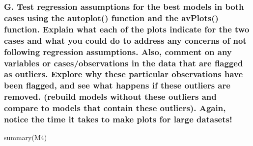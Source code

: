 \documentclass[
]{article}
\newenvironment{Shaded}{\begin{snugshade}}{\end{snugshade}}
\newcommand{\FunctionTok}[1]{\textcolor[rgb]{0.00,0.00,0.00}{#1}}
\newcommand{\NormalTok}[1]{#1}
\begin{document}
\hypertarget{g.-test-regression-assumptions-for-the-best-models-in-both-cases-using-the-autoplot-function-and-the-avplots-function.-explain-what-each-of-the-plots-indicate-for-the-two-cases-and-what-you-could-do-to-address-any-concerns-of-not-following-regression-assumptions.-also-comment-on-any-variables-or-casesobservations-in-the-data-that-are-flagged-as-outliers.-explore-why-these-particular-observations-have-been-flagged-and-see-what-happens-if-these-outliers-are-removed.-rebuild-models-without-these-outliers-and-compare-to-models-that-contain-these-outliers.-again-notice-the-time-it-takes-to-make-plots-for-large-datasets}{%
\subsubsection{G. Test regression assumptions for the best models in
both cases using the autoplot() function and the avPlots() function.
Explain what each of the plots indicate for the two cases and what you
could do to address any concerns of not following regression
assumptions. Also, comment on any variables or cases/observations in the
data that are flagged as outliers. Explore why these particular
observations have been flagged, and see what happens if these outliers
are removed. (rebuild models without these outliers and compare to
models that contain these outliers). Again, notice the time it takes to
make plots for large
datasets!}\label{g.-test-regression-assumptions-for-the-best-models-in-both-cases-using-the-autoplot-function-and-the-avplots-function.-explain-what-each-of-the-plots-indicate-for-the-two-cases-and-what-you-could-do-to-address-any-concerns-of-not-following-regression-assumptions.-also-comment-on-any-variables-or-casesobservations-in-the-data-that-are-flagged-as-outliers.-explore-why-these-particular-observations-have-been-flagged-and-see-what-happens-if-these-outliers-are-removed.-rebuild-models-without-these-outliers-and-compare-to-models-that-contain-these-outliers.-again-notice-the-time-it-takes-to-make-plots-for-large-datasets}}

\begin{Shaded}
\begin{Highlighting}[]
\FunctionTok{summary}\NormalTok{(M4)}
\end{Highlighting}
\end{Shaded}
\end{document}
